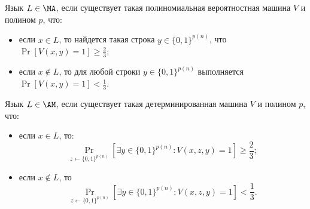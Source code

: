 





\setcounter{curtask}{52}


\begin{definition*}
    Язык $L \in \MA$, если  существует такая полиномиальная вероятностная машина $V$ и полином $p$, что:
    \begin{itemize}
        \item если $x \in L$, то найдется такая строка $y \in \{0, 1\}^{p(n)}$, что $\Pr[V(x, y) = 1] \ge
            \frac{2}{3}$;
        \item если $x \notin L$, то для любой строки $y \in \{0, 1\}^{p(n)}$ выполняется $\Pr[V(x, y) =
            1] < \frac{1}{3}$.
    \end{itemize}
\end{definition*}



\begin{definition*}
    Язык $L \in \AM$, если  существует такая детерминированная машина $V$ и полином $p$, что:
    \begin{itemize}
        \item если $x \in L$, то:
            $$
                \Pr\limits_{z \gets \{0, 1\}^{p(n)}}[\exists y \in \{0, 1\}^{p(n)}: V(x, z, y) = 1] \ge
                \frac{2}{3};
            $$
        \item если $x \notin L$, то
            $$
                \Pr\limits_{z \gets \{0, 1\}^{p(n)}}[\exists y \in \{0, 1\}^{p(n)}: V(x, z, y) = 1] <
                \frac{1}{3}.
            $$
            
    \end{itemize}
\end{definition*}



\breakline








